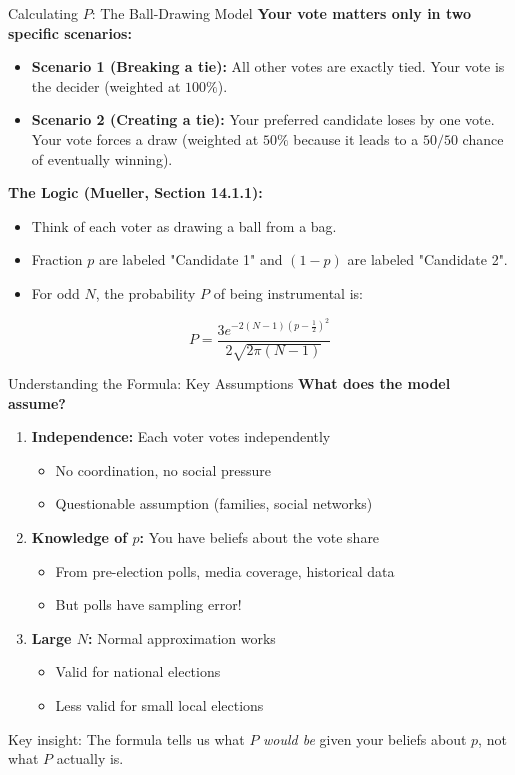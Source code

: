 \documentclass[10pt]{beamer}
\begin{document}
\begin{frame}{Calculating $P$: The Ball-Drawing Model}
\textbf{Your vote matters only in two specific scenarios:}
\begin{itemize}
\item \textbf{Scenario 1 (Breaking a tie):} All other votes are exactly tied. Your vote is the decider (weighted at $100\%$).
\item \textbf{Scenario 2 (Creating a tie):} Your preferred candidate loses by one vote. Your vote forces a draw (weighted at $50\%$ because it leads to a $50/50$ chance of eventually winning).
\end{itemize}

\vspace{0.4cm}
\textbf{The Logic (Mueller, Section 14.1.1):}
\begin{itemize}
\item Think of each voter as drawing a ball from a bag.
\item Fraction $p$ are labeled "Candidate 1" and $(1-p)$ are labeled "Candidate 2".
\item For odd $N$, the probability $P$ of being instrumental is:
\end{itemize}

\begin{equation*}
P = \frac{3e^{-2(N-1)(p-\frac{1}{2})^2}}{2\sqrt{2\pi(N-1)}}
\end{equation*}
\end{frame}

\begin{frame}{Understanding the Formula: Key Assumptions}
\textbf{What does the model assume?}

\begin{enumerate}
\item \textbf{Independence:} Each voter votes independently
\begin{itemize}
\item No coordination, no social pressure
\item Questionable assumption (families, social networks)
\end{itemize}

\item \textbf{Knowledge of $p$:} You have beliefs about the vote share
\begin{itemize}
\item From pre-election polls, media coverage, historical data
\item But polls have sampling error!
\end{itemize}

\item \textbf{Large $N$:} Normal approximation works
\begin{itemize}
\item Valid for national elections
\item Less valid for small local elections
\end{itemize}
\end{enumerate}

\alert{Key insight:} The formula tells us what $P$ \emph{would be} given your beliefs about $p$, not what $P$ actually is.
\end{frame}
\end{document}
